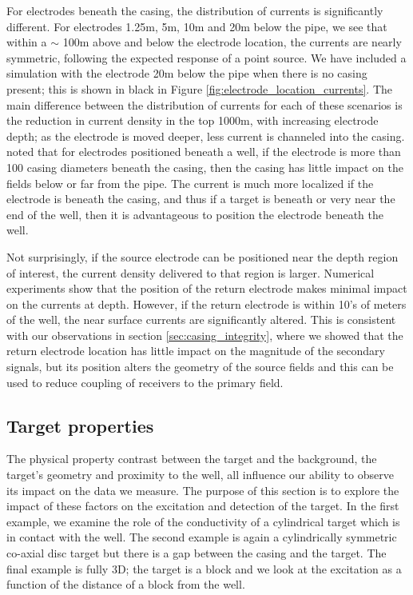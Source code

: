 For electrodes beneath the casing, the distribution of currents is significantly different. For electrodes 1.25m, 5m, 10m and 20m below the pipe, we see that within a $\sim$ 100m above and below the electrode location, the currents are nearly symmetric, following the expected response of a point source. We have included a simulation with the electrode 20m below the pipe when there is no casing present; this is shown in black in Figure \ref{fig:electrode_location_currents}. The main difference between the distribution of currents for each of these scenarios is the reduction in current density in the top 1000m, with increasing electrode depth; as the electrode is moved deeper, less current is channeled into the casing. \cite{Schenkel1990} noted that for electrodes positioned beneath a well, if the electrode is more than 100 casing diameters beneath the casing, then the casing has little impact on the fields below or far from the pipe. The current is much more localized if the electrode is beneath the casing, and thus if a target is beneath or very near the end of the well, then it is advantageous to position the electrode beneath the well.

Not surprisingly, if the source electrode can be positioned near the depth region of interest, the current density delivered to that region is larger. Numerical experiments show that the position of the return electrode makes minimal impact on the currents at depth. However, if the return electrode is within 10’s of meters of the well, the near surface currents are significantly altered. This is consistent with our observations in section \ref{sec:casing_integrity}, where we showed that the return electrode location has little impact on the magnitude of the secondary signals, but its position alters the geometry of the source fields and this can be used to reduce coupling of receivers to the primary field.




\subsection{Target properties}
The physical property contrast between the target and the background, the target’s geometry and proximity to the well, all influence our ability to observe its impact on the data we measure. The purpose of this section is to explore the impact of these factors on the excitation and detection of the target. In the first example, we examine the role of the conductivity of a cylindrical target which is in contact with  the well. The second example is again a cylindrically symmetric co-axial disc target but there is a gap between the casing and the target. The final example is fully 3D; the target is a block and we look at the excitation as a function of the distance of a block from the well.

